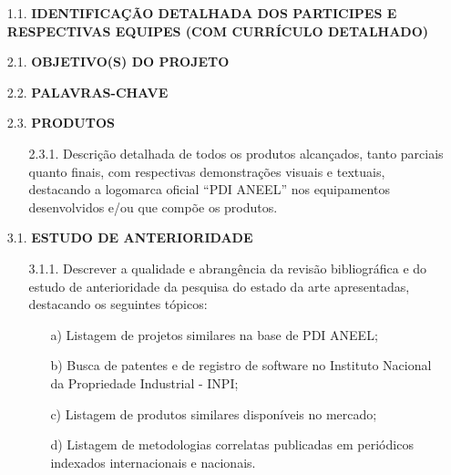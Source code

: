 {\itshape
\leftskip 2cm
\begin{lmarginbox}
    \begin{enumerate}[leftmargin=1cm, font=\bfseries]
        \item[1.1.] \textbf{IDENTIFICAÇÃO DETALHADA DOS PARTICIPES E RESPECTIVAS EQUIPES (COM CURRÍCULO DETALHADO)}

        \item[2.1.] \textbf{OBJETIVO(S) DO \textbf{PROJETO}}

        \item[2.2.] \textbf{PALAVRAS-CHAVE}

        \item[2.3.] \textbf{PRODUTOS}

            \begin{enumerate}[font=\bfseries]
                \item[2.3.1.] Descrição detalhada de todos os produtos alcançados, tanto parciais quanto finais, com respectivas demonstrações visuais e textuais, destacando a logomarca oficial “PDI ANEEL” nos equipamentos desenvolvidos e/ou que compõe os produtos.
            \end{enumerate}

        \item[3.1.]	\textbf{ESTUDO DE ANTERIORIDADE}

            \begin{enumerate}[font=\bfseries]
                \item[3.1.1.]	Descrever a qualidade e abrangência da revisão bibliográfica e do estudo de anterioridade da pesquisa do estado da arte apresentadas, destacando os seguintes tópicos:

                    \begin{enumerate}[font=\bfseries]
                        \item[a)] Listagem de projetos similares na base de PDI ANEEL;
                        \item[b)] Busca de patentes e de registro de software no Instituto Nacional da Propriedade Industrial - INPI;
                        \item[c)] Listagem de produtos similares disponíveis no mercado;
                        \item[d)] Listagem de metodologias correlatas publicadas em periódicos indexados internacionais e nacionais.
                    \end{enumerate}
            \end{enumerate}


\end{enumerate}
\end{lmarginbox}}
